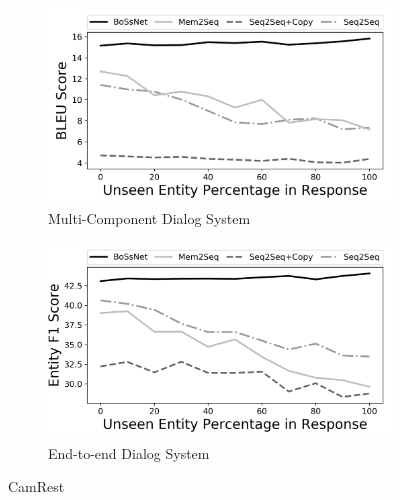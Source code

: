 \begin{figure}[!t]
\centering
\begin{subfigure}{0.8\textwidth}
 \includegraphics[width=\linewidth]{assets/graphs/camrest_BLEU.png}
 \caption{Multi-Component Dialog System}\label{fig:systemfull}
\end{subfigure}

\vspace*{0.5in}

\begin{subfigure}{0.8\textwidth}
 \includegraphics[width=\linewidth]{assets/graphs/camrest_F1.png}
 \caption{End-to-end Dialog System}\label{fig:end2end}
\end{subfigure}

\caption{CamRest}
\end{figure}

\clearpage

